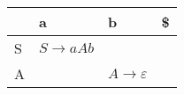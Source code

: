 \documentclass{standalone}
\providecommand\lightrule{%
	\arrayrulecolor{black!30}%
	\midrule[\lightrulewidth]%
	\arrayrulecolor{black}}
\begin{document}
\begin{tabularx}{\textwidth}{XXXX}
     & a & b & \$ \\
    \midrule
        S
        &
        \(S \rightarrow aAb\)
        &
        
        &
        \\ \lightrule
        A
        &
        
        &
        \(A \rightarrow \varepsilon\)
        &
\end{tabularx}
\end{document}
